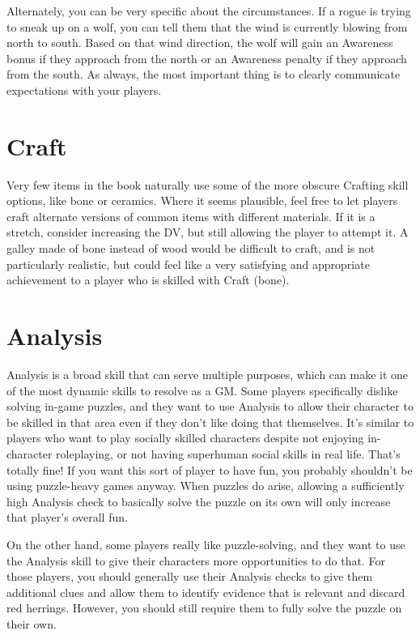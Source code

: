   Alternately, you can be very specific about the circumstances.
  If a rogue is trying to sneak up on a wolf, you can tell them that the wind is currently blowing from north to south.
  Based on that wind direction, the wolf will gain an Awareness bonus if they approach from the north or an Awareness penalty if they approach from the south.
  As always, the most important thing is to clearly communicate expectations with your players.

\section{Craft}

  Very few items in the book naturally use some of the more obscure Crafting skill options, like bone or ceramics.
  Where it seems plausible, feel free to let players craft alternate versions of common items with different materials.
  If it is a stretch, consider increasing the DV, but still allowing the player to attempt it.
  A galley made of bone instead of wood would be difficult to craft, and is not particularly realistic, but could feel like a very satisfying and appropriate achievement to a player who is skilled with Craft (bone).

\section{Analysis}

  Analysis is a broad skill that can serve multiple purposes, which can make it one of the most dynamic skills to resolve as a GM.
  Some players specifically dislike solving in-game puzzles, and they want to use Analysis to allow their character to be skilled in that area even if they don't like doing that themselves.
  It's similar to players who want to play socially skilled characters despite not enjoying in-character roleplaying, or not having superhuman social skills in real life.
  That's totally fine!
  If you want this sort of player to have fun, you probably shouldn't be using puzzle-heavy games anyway.
  When puzzles do arise, allowing a sufficiently high Analysis check to basically solve the puzzle on its own will only increase that player's overall fun.

  On the other hand, some players really like puzzle-solving, and they want to use the Analysis skill to give their characters more opportunities to do that.
  For those players, you should generally use their Analysis checks to give them additional clues and allow them to identify evidence that is relevant and discard red herrings.
  However, you should still require  them to fully solve the puzzle on their own.

